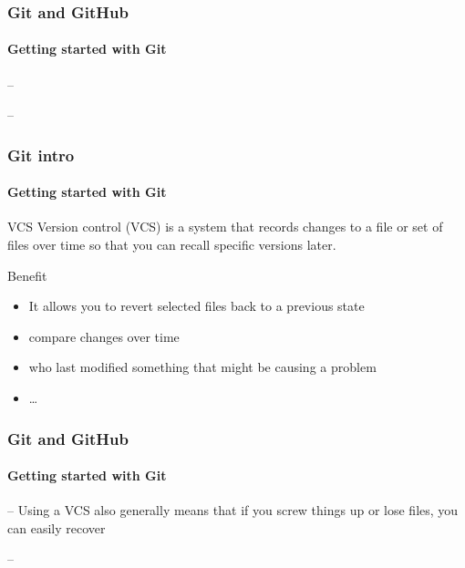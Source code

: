 \begin{frame}
    \frametitle{Git and GitHub}
    \framesubtitle{Getting started with Git}
    \addtocounter{nframe}{1}
    
    \begin{block}{--}
    \end{block}

    \begin{block}{--}
    \end{block}

\end{frame}

\begin{frame}
    \frametitle{Git intro}
    \framesubtitle{Getting started with Git}
    \addtocounter{nframe}{1}
    
    \begin{block}{VCS}
        Version control (VCS) is a system that records changes to a file or set of files over time so that you can recall specific versions later.
    \end{block}

    \begin{block}{Benefit}
        \begin{itemize}
            \item It allows you to revert selected files back to a previous state
            \item compare changes over time
            \item who last modified something that might be causing a problem
            \item \dots
        \end{itemize}
    \end{block}

\end{frame}


\begin{frame}
    \frametitle{Git and GitHub}
    \framesubtitle{Getting started with Git}
    \addtocounter{nframe}{1}
    
    \begin{block}{--}
        Using a VCS also generally means that if you screw things up or lose files, you can easily recover
    \end{block}

    \begin{block}{--}
    \end{block}

\end{frame}

